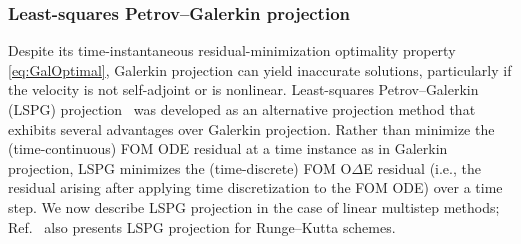 \documentclass[3p,computermodern,10pt]{elsarticle}
\begin{document}
\subsubsection{Least-squares Petrov--Galerkin projection}
Despite its time-instantaneous residual-minimization optimality property 
\eqref{eq:GalOptimal}, Galerkin projection can yield inaccurate solutions,
particularly if the velocity is not self-adjoint or
is nonlinear. 
Least-squares Petrov--Galerkin (LSPG)
projection~\cite{carlberg_lspg_v_galerkin,carlberg_thesis,carlberg_gnat,bui_unsteady,bui_thesis}
was developed
as an alternative projection method that exhibits several advantages over Galerkin
projection.
Rather than minimize the (time-continuous) FOM ODE residual at a time instance as in Galerkin
projection, LSPG minimizes
the (time-discrete) FOM O$\Delta$E residual 
(i.e., the residual arising after applying time discretization to the FOM ODE)
over a time step.
We now describe LSPG projection in the case of linear multistep methods;
Ref.~\cite{carlberg_lspg_v_galerkin} also presents LSPG projection for Runge--Kutta
schemes. 
\end{document}
